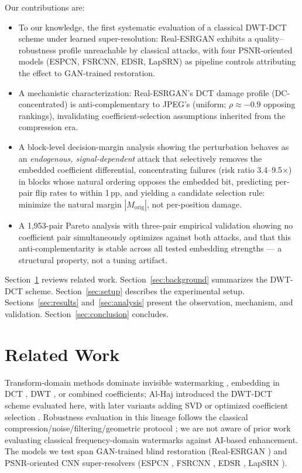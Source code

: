 \documentclass[conference]{IEEEtran}
\begin{document}
Our contributions are:
\begin{itemize}
\item To our knowledge, the first systematic evaluation of a classical
DWT-DCT scheme under learned super-resolution: Real-ESRGAN exhibits a
quality--robustness profile unreachable by classical attacks, with four
PSNR-oriented models (ESPCN, FSRCNN, EDSR, LapSRN) as pipeline controls
attributing the effect to GAN-trained restoration.
\item A mechanistic characterization: Real-ESRGAN's DCT damage profile
(DC-concentrated) is anti-complementary to JPEG's (uniform;
$\rho \approx -0.9$ opposing rankings), invalidating coefficient-selection
assumptions inherited from the compression era.
\item A block-level decision-margin analysis showing the perturbation
behaves as an \emph{endogenous, signal-dependent} attack that selectively
removes the embedded coefficient differential, concentrating failures
(risk ratio 3.4--9.5$\times$) in blocks whose natural ordering opposes
the embedded bit, predicting per-pair flip rates to within 1\,pp, and
yielding a candidate selection rule: minimize the natural margin
$|M_{\mathrm{orig}}|$, not per-position damage.
\item A 1,953-pair Pareto analysis with three-pair empirical validation
showing no coefficient pair simultaneously optimizes against both
attacks, and that this anti-complementarity is stable across all tested
embedding strengths --- a structural property, not a tuning artifact.
\end{itemize}

Section~\ref{sec:related} reviews related work.
Section~\ref{sec:background} summarizes the DWT-DCT scheme.
Section~\ref{sec:setup} describes the experimental setup.
Sections~\ref{sec:results} and~\ref{sec:analysis} present the
observation, mechanism, and validation. Section~\ref{sec:conclusion}
concludes.

\section{Related Work}
\label{sec:related}

Transform-domain methods dominate invisible watermarking
\cite{cox2007}, embedding in DCT \cite{piva1997}, DWT \cite{barni2001},
or combined coefficients; Al-Haj \cite{alhaj2007} introduced the DWT-DCT
scheme evaluated here, with later variants adding SVD \cite{navas2008}
or optimized coefficient selection \cite{rijati2025}. Robustness
evaluation in this lineage follows the classical
compression/noise/filtering/geometric protocol \cite{petitcolas1998};
we are not aware of prior work evaluating classical frequency-domain
watermarks against AI-based enhancement. The models we test span
GAN-trained blind restoration (Real-ESRGAN \cite{realesrgan2021}) and
PSNR-oriented CNN super-resolvers (ESPCN \cite{espcn2016}, FSRCNN
\cite{fsrcnn2016}, EDSR \cite{edsr2017}, LapSRN \cite{lapsrn2017}).
\end{document}
